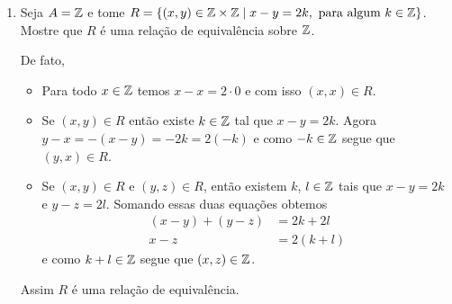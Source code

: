 \documentclass{beamer}
\begin{document}
\begin{frame}
\begin{exemplos}
\begin{enumerate}[label={\arabic*})]
                \item Seja $A = \mathbb{Z}$ e tome $R = \{(x,y)\in \mathbb{Z} \times \mathbb{Z} \mid x - y = 2k, \mbox{ para algum } k \in \mathbb{Z}\}$. Mostre que $R$
                \'e uma rela{\c c}{\~a}o de equival{\^e}ncia sobre $\mathbb{Z}$.
                \begin{solucao}
                    De fato,
                    \begin{itemize}
                        \item Para todo $x\in\mathbb{Z}$ temos $x - x = 2\cdot0$ e com isso $(x,x) \in R$.
                        \item Se $(x,y) \in R$ ent\~ao existe $k \in \mathbb{Z}$ tal que $x - y = 2k$. Agora $y - x = -(x - y) = -2k = 2 (-k)$ 
                        e como $-k \in \mathbb{Z}$ segue que $(y,x) \in R$.
                        \item Se $(x,y) \in R$ e $(y,z) \in R$, ent\~ao existem $k$, $l\in \mathbb{Z}$ tais que $x - y = 2k$ e $y - z = 2l$.
                        Somando essas duas equa\c{c}\~oes obtemos
                        \begin{align*}
                            (x - y) + (y - z) &= 2k + 2l\\
                            x - z &= 2(k + l)
                        \end{align*}
                        e como $k + l \in \mathbb{Z}$ segue que $(x,z) \in \mathbb{Z}$.
                    \end{itemize}
                    Assim $R$ \'e uma rela\c{c}\~ao de equival\^encia.
                \end{solucao}
            \end{enumerate}
        \end{exemplos}
    \end{frame}
\end{document}
